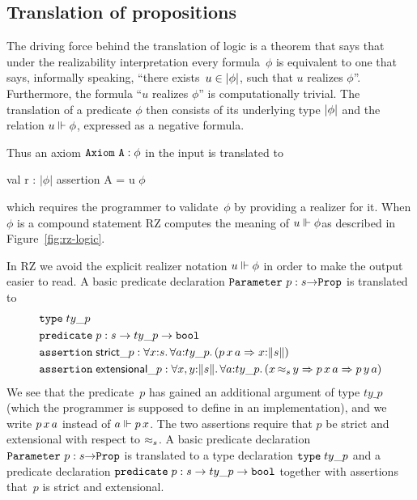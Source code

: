 \subsection{Translation of propositions}
\label{sec:transl-prop}

The driving force behind the translation of logic is a theorem
\cite[4.4.10]{Troelstra:van-Dalen:88:1} that says that under the
realizability interpretation every formula~$\phi$ is equivalent to one
that says, informally speaking, ``there exists~$u \in |\phi|$,
such that $u$ realizes $\phi$''. Furthermore, the formula ``$u$
realizes $\phi$'' is computationally trivial. The translation of a
predicate $\phi$ then consists of its underlying type $|\phi|$
and the relation $u \Vdash \phi$, expressed as a negative formula.

Thus an axiom $\mathtt{Axiom}\ \mathtt{A} : \phi$ in the input is translated to
%
\newcommand{\iTypeOfPhi}{$|\phi|$}
\newcommand{\iPhi}{$\phi$}
\begin{source}
val r : \iTypeOfPhi
assertion A = u \iRz \iPhi
\end{source}
%
which requires the programmer to validate~$\phi$ by providing a
realizer for it. When $\phi$ is a compound statement RZ computes the
meaning \iflong of $u \Vdash \phi$\fi as described in
Figure~\ref{fig:rz-logic}.

In RZ we avoid the explicit realizer notation $u \Vdash \phi$ in order to
make the output easier to read.
%
\iflong
%
A basic predicate declaration $\mathtt{Parameter}\ p : s{\to}\mathtt{Prop}$ is
translated to
%
\begin{align*}
  & \otyspec{ty\_p} \\
  & \opropspec{p}{s \to ty\_p \to \oProp} \\
  & \oassertion{\mathsf{strict}\_p}{
    \oforall{x}{s}{
      \oforall{a}{ty\_p}{
        (\oimply
        {\oapp{\oapp{p}{x}}{a}}
        {\ototal{x}{s}
        })
      }
    }
  } \\
  & \oassertion{\mathsf{extensional}\_p}{
    \oforallt{x,y}{s}{
      \oforall{a}{ty\_p}{
          (\oimply{\oper{s}{x}{y}}
          {\oimply{\oapp{\oapp{p}{x}}{a}}{\oapp{\oapp{p}{y}}{a}}})
          }}}
\end{align*}
%
We see that the predicate~$p$ has gained an additional argument of
type $ty\_p$ (which the programmer is supposed to define in an
implementation), and we write $p\,x\,a$ instead of $a
\Vdash p\,x$. The two assertions require that $p$ be strict and
extensional with respect to $\approx_s$.
%
\else %
%
A basic predicate declaration $\mathtt{Parameter}\ p : s{\to}\mathtt{Prop}$ is
translated to a type declaration $\mathtt{type}\;ty\_p$ and a predicate
declaration $\mathtt{predicate}\; p:s \to ty\_p \to \mathtt{bool}$ together with
assertions that~$p$ is strict and extensional.
%
\fi %

